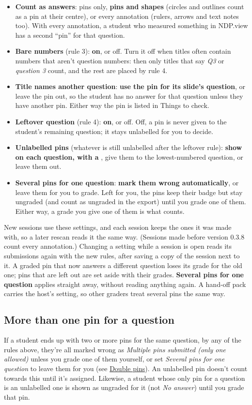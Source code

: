 \begin{itemize}[topsep=2pt, itemsep=3pt]
\item \textbf{Count as answers}: pins only, \textbf{pins and shapes} (circles and outlines count as a pin at their centre), or every annotation (rulers, arrows and text notes too). With every annotation, a student who measured something in NDP.view has a second ``pin'' for that question.
\item \textbf{Bare numbers} (rule 3): \textbf{on}, or off. Turn it off when titles often contain numbers that aren't question numbers: then only titles that say \emph{Q3} or \emph{question 3} count, and the rest are placed by rule 4.
\item \textbf{Title names another question}: \textbf{use the pin for its slide's question}, or leave the pin out, so the student has no answer for that question unless they have another pin. Either way the pin is listed in Things to check.
\item \textbf{Leftover question} (rule 4): \textbf{on}, or off. Off, a pin is never given to the student's remaining question; it stays unlabelled for you to decide.
\item \textbf{Unlabelled pins} (whatever is still unlabelled after the leftover rule): \textbf{show on each question, with a }, give them to the lowest-numbered question, or leave them out.
\item \textbf{Several pins for one question}: \textbf{mark them wrong automatically}, or leave them for you to grade. Left for you, the pins keep their  badge but stay ungraded (and count as ungraded in the export) until you grade one of them. Either way, a grade you give one of them is what counts.
\end{itemize}

New sessions use these settings, and each session keeps the ones it was made with, so a later rescan reads it the same way. (Sessions made before version 0.3.8 count every annotation.) Changing a setting while a session is open reads its submissions again with the new rules, after saving a copy of the session next to it. A graded pin that now answers a different question loses its grade for the old one; pins that are left out are set aside with their grades. \textbf{Several pins for one question} applies straight away, without reading anything again. A hand-off pack carries the host's setting, so other graders treat several pins the same way.

\subsection*{More than one pin for a question}

If a student ends up with two or more pins for the same question, by any of the rules above, they're all marked wrong as \emph{Multiple pins submitted (only one allowed)} unless you grade one of them yourself, or set \emph{Several pins for one question} to leave them for you (see \hyperref[sec:grading:double-pins]{Double pins}). An unlabelled  pin doesn't count towards this until it's assigned. Likewise, a student whose only pin for a question is an unlabelled one is shown as ungraded for it (not \emph{No answer}) until you grade that pin.
